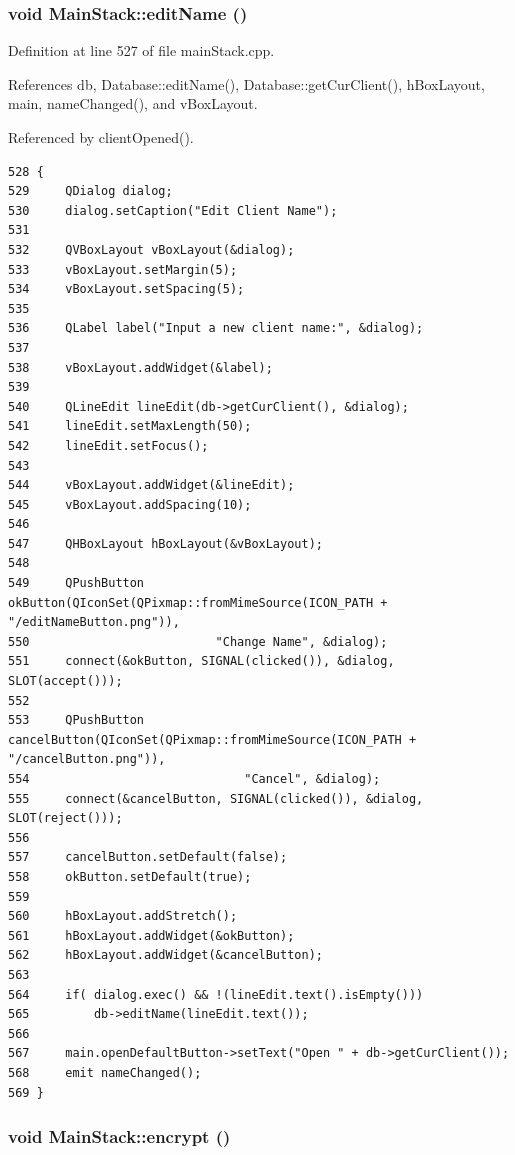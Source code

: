 \hypertarget{classMainStack_k3}{
\subsubsection[editName]{\setlength{\rightskip}{0pt plus 5cm}void Main\-Stack::edit\-Name ()}}
\label{classMainStack_k3}


Definition at line 527 of file main\-Stack.cpp.

References db, Database::edit\-Name(), Database::get\-Cur\-Client(), h\-Box\-Layout, main, name\-Changed(), and v\-Box\-Layout.

Referenced by client\-Opened().

\footnotesize\begin{verbatim}528 {
529     QDialog dialog;
530     dialog.setCaption("Edit Client Name");
531 
532     QVBoxLayout vBoxLayout(&dialog);
533     vBoxLayout.setMargin(5);
534     vBoxLayout.setSpacing(5);
535 
536     QLabel label("Input a new client name:", &dialog);
537 
538     vBoxLayout.addWidget(&label);
539 
540     QLineEdit lineEdit(db->getCurClient(), &dialog);
541     lineEdit.setMaxLength(50);
542     lineEdit.setFocus();
543 
544     vBoxLayout.addWidget(&lineEdit);
545     vBoxLayout.addSpacing(10);
546 
547     QHBoxLayout hBoxLayout(&vBoxLayout);
548 
549     QPushButton okButton(QIconSet(QPixmap::fromMimeSource(ICON_PATH + "/editNameButton.png")),
550                          "Change Name", &dialog);
551     connect(&okButton, SIGNAL(clicked()), &dialog, SLOT(accept()));
552 
553     QPushButton cancelButton(QIconSet(QPixmap::fromMimeSource(ICON_PATH + "/cancelButton.png")),
554                              "Cancel", &dialog);
555     connect(&cancelButton, SIGNAL(clicked()), &dialog, SLOT(reject()));
556 
557     cancelButton.setDefault(false);
558     okButton.setDefault(true);
559 
560     hBoxLayout.addStretch();
561     hBoxLayout.addWidget(&okButton);
562     hBoxLayout.addWidget(&cancelButton);
563 
564     if( dialog.exec() && !(lineEdit.text().isEmpty()))
565         db->editName(lineEdit.text());
566 
567     main.openDefaultButton->setText("Open " + db->getCurClient());
568     emit nameChanged();
569 }
\end{verbatim}\normalsize 


\hypertarget{classMainStack_k7}{
\subsubsection[encrypt]{\setlength{\rightskip}{0pt plus 5cm}void Main\-Stack::encrypt ()}}
\label{classMainStack_k7}


